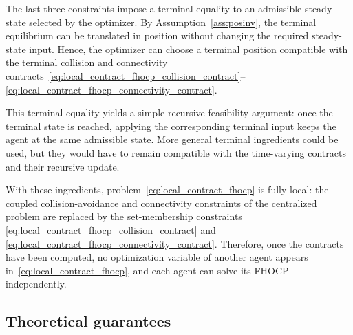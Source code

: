 \documentclass[letterpaper, 10 pt, conference]{ieeeconf}  %
\begin{document}
The last three constraints impose a terminal equality to an admissible steady
state selected by the optimizer. By Assumption~\ref{ass:posinv}, the terminal
equilibrium can be translated in position without changing the required
steady-state input. Hence, the optimizer can choose a terminal position
compatible with the terminal collision and connectivity contracts~\eqref{eq:local_contract_fhocp_collision_contract}--\eqref{eq:local_contract_fhocp_connectivity_contract}.

This terminal equality yields a simple recursive-feasibility argument: once the
terminal state is reached, applying the corresponding terminal input keeps the
agent at the same admissible state. More general terminal ingredients could be
used, but they would have to remain compatible with the time-varying contracts
and their recursive update.

With these ingredients, problem~\eqref{eq:local_contract_fhocp} is fully local:
the coupled collision-avoidance and connectivity constraints of the centralized
problem are replaced by the set-membership constraints
\eqref{eq:local_contract_fhocp_collision_contract} and
\eqref{eq:local_contract_fhocp_connectivity_contract}. Therefore, once the
contracts have been computed, no optimization variable of another agent appears
in~\eqref{eq:local_contract_fhocp}, and each agent can solve its FHOCP
independently.



\subsection{Theoretical guarantees}\label{subsec:guarantees}
\end{document}
